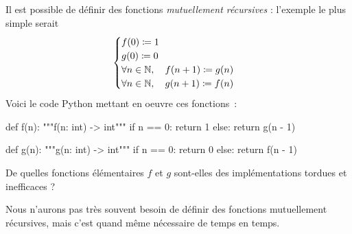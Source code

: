 \documentclass{magnolia}
\begin{document}
Il est possible de définir des fonctions
\emph{mutuellement récursives} : l'exemple le plus simple serait
\[
  \begin{cases}
    f(0) \coloneqq 1 \\
    g(0) \coloneqq 0 \\
    \forall n \in \mathbb{N},\quad f(n + 1) \coloneqq g(n) \\
    \forall n \in \mathbb{N},\quad g(n + 1) \coloneqq f(n)
  \end{cases}
\]
Voici le code Python mettant en oeuvre ces fonctions~:
\begin{pythoncodeline}
def f(n):
    """f(n: int) -> int"""
    if n == 0:
        return 1
    else:
        return g(n - 1)

def g(n):
    """g(n: int) -> int"""
    if n == 0:
        return 0
    else:
        return f(n - 1)
\end{pythoncodeline}

\begin{exoUnique}
\exo
  De quelles fonctions élémentaires $f$ et $g$ sont-elles des
  implémentations tordues et inefficaces ?
\end{exoUnique}
\vspace{2ex}
Nous n'aurons pas très souvent besoin de définir des fonctions mutuellement
récursives, mais c'est quand même nécessaire de temps en temps.

\end{document}
